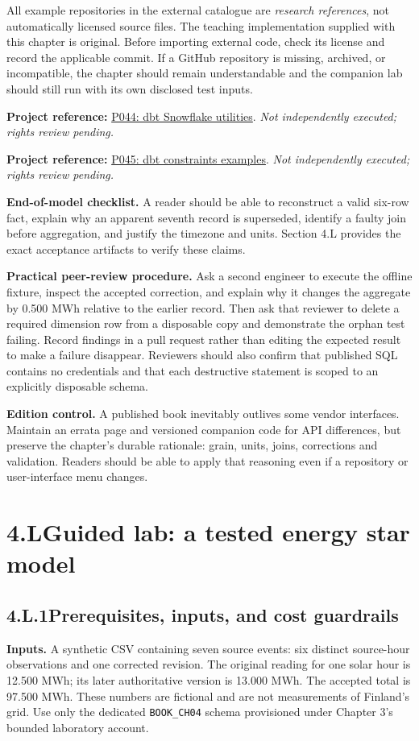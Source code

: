 \documentclass[11pt,twoside]{article}
\newcommand{\topic}[2]{\subsection*{#1\quad #2}}
\newcommand{\repo}[2]{\par\begingroup\fontsize{8.0}{9.6}\selectfont\sffamily\color{inkgray}\textbf{Project reference:} \href{#2}{#1}. \textit{Not independently executed; rights review pending.}\par\endgroup}
\begin{document}
All example repositories in the external catalogue are \emph{research references}, not automatically licensed source files. The teaching implementation supplied with this chapter is original. Before importing external code, check its license and record the applicable commit. If a GitHub repository is missing, archived, or incompatible, the chapter should remain understandable and the companion lab should still run with its own disclosed test inputs.

\repo{P044: dbt Snowflake utilities}{https://github.com/Montreal-Analytics/dbt-snowflake-utils}
\repo{P045: dbt constraints examples}{https://github.com/Snowflake-Labs/dbt_constraints}

\textbf{End-of-model checklist.} A reader should be able to reconstruct a valid six-row fact, explain why an apparent seventh record is superseded, identify a faulty join before aggregation, and justify the timezone and units. Section 4.L provides the exact acceptance artifacts to verify these claims.


\textbf{Practical peer-review procedure.} Ask a second engineer to execute the offline fixture, inspect the accepted correction, and explain why it changes the aggregate by 0.500 MWh relative to the earlier record. Then ask that reviewer to delete a required dimension row from a disposable copy and demonstrate the orphan test failing. Record findings in a pull request rather than editing the expected result to make a failure disappear. Reviewers should also confirm that published SQL contains no credentials and that each destructive statement is scoped to an explicitly disposable schema.\par
\textbf{Edition control.} A published book inevitably outlives some vendor interfaces. Maintain an errata page and versioned companion code for API differences, but preserve the chapter's durable rationale: grain, units, joins, corrections and validation. Readers should be able to apply that reasoning even if a repository or user-interface menu changes.

\newpage
\section*{4.L\quad Guided lab: a tested energy star model}
\topic{4.L.1}{Prerequisites, inputs, and cost guardrails}
\textbf{Inputs.} A synthetic CSV containing seven source events: six distinct source-hour observations and one corrected revision. The original reading for one solar hour is 12.500 MWh; its later authoritative version is 13.000 MWh. The accepted total is 97.500 MWh. These numbers are fictional and are not measurements of Finland's grid. Use only the dedicated \texttt{BOOK\_CH04} schema provisioned under Chapter 3's bounded laboratory account.
\end{document}
